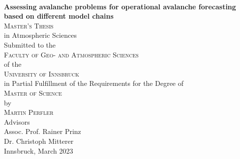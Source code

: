 \begin{titlepage}
\begin{center}

~\\[15mm]
{\Huge  {\bf Assessing avalanche problems for operational avalanche 
            forecasting based on different model chains}}\\[5mm]




{\Large \textsc{Master's Thesis}} \\[\spaceTitlepage]


{\large in Atmospheric Sciences} \\[\spaceTitlepage]


{\large Submitted to the} \\[2mm]
{\Large \textsc{Faculty of Geo- and Atmospheric Sciences}} \\[2mm]
{\large of the} \\[2mm]
{\Large \textsc{University of Innsbruck}} \\[\spaceTitlepage]


{\large in Partial Fulfillment of the Requirements for the Degree of} \\[2mm]
{\Large \textsc{Master of Science}} \\[\spaceTitlepage]


{\large by} \\[2mm]
{\Large \textsc{Martin Perfler}} \\[\spaceTitlepage]


{\large Advisors} \\[2mm]
{\large Assoc. Prof. Rainer Prinz} \\ [2mm]
{\large Dr. Christoph Mitterer} \\ [\spaceTitlepage]


{\large Innsbruck, March 2023}

\end{center}
\end{titlepage}
